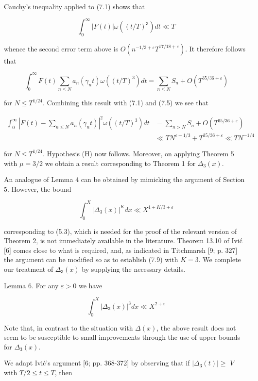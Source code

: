 \documentclass[10pt]{article}
\begin{document}
Cauchy's inequality applied to (7.1) shows that

$$
\int_{0}^{\infty}|F(t)| \omega\left((t / T)^{3}\right) d t \ll T
$$

whence the second error term above is $O\left(n^{-1 / 3+\varepsilon} T^{17 / 18+\varepsilon}\right)$. It therefore follows that

$$
\int_{0}^{\infty} F(t) \sum_{n \leq N} a_{n}\left(\gamma_{n} t\right) \omega\left((t / T)^{3}\right) d t=\sum_{n \leq N} S_{n}+O\left(T^{35 / 36+\varepsilon}\right)
$$

for $N \leq T^{1 / 24}$. Combining this result with (7.1) and (7.5) we see that

$$
\begin{aligned}
\int_{0}^{\infty}\left|F(t)-\sum_{n \leq N} a_{n}\left(\gamma_{n} t\right)\right|^{2} \omega\left((t / T)^{3}\right) d t & =\sum_{n>N} S_{n}+O\left(T^{35 / 36+\varepsilon}\right) \\
& \ll T N^{\varepsilon-1 / 3}+T^{35 / 36+\varepsilon} \ll T N^{-1 / 4}
\end{aligned}
$$

for $N \leq T^{1 / 24}$. Hypothesis (H) now follows. Moreover, on applying Theorem 5 with $\mu=3 / 2$ we obtain a result corresponding to Theorem 1 for $\Delta_{3}(x)$.

An analogue of Lemma 4 can be obtained by mimicking the argument of Section 5. However, the bound


\begin{equation*}
\int_{0}^{X}\left|\Delta_{3}(x)\right|^{K} d x \ll X^{1+K / 3+\varepsilon} \tag{7.9}
\end{equation*}


corresponding to (5.3), which is needed for the proof of the relevant version of Theorem 2, is not immediately available in the literature. Theorem 13.10 of Ivić [6] comes close to what is required, and, as indicated in Titchmarsh [9; p. 327] the argument can be modified so as to establish (7.9) with $K=3$. We complete our treatment of $\Delta_{3}(x)$ by supplying the necessary details.

Lemma 6. For any $\varepsilon>0$ we have

$$
\int_{0}^{X}\left|\Delta_{3}(x)\right|^{3} d x \ll X^{2+\varepsilon}
$$

Note that, in contrast to the situation with $\Delta(x)$, the above result does not seem to be susceptible to small improvements through the use of upper bounds for $\Delta_{3}(x)$.

We adapt Ivić's argument [6; pp. 368-372] by observing that if $\left|\Delta_{3}(t)\right| \geq$ $V$ with $T / 2 \leq t \leq T$, then
\end{document}
